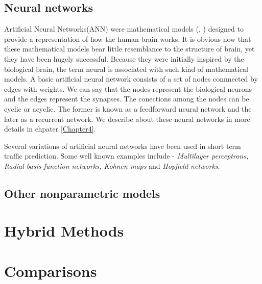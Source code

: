 \subsection{Neural networks}
\label{subsec:neuralNetworksTrafficPred}
Artificial Neural Networks(ANN) were mathematical models (\citet{mcculloch1943logical},
\citet{rosenblatt1958perceptron}) designed to  provide a representation of how the human brain
works. It is obvious now that these mathematical models bear little resemblance to the structure
of brain, yet they have been hugely successful. Because they were initially inspired by the
biological brain, the term neural is associated with such kind of mathematical models. A basic
artificial neural network consists of a set of nodes connnected by edges with weights. We can say
that the nodes represent the biological neurons and the edges represent the synapses. The
conections among the nodes can be cyclic or acyclic. The former is known as a feedforward neural
network and the later as a recurrent network. We describe about these neural networks in more
details in chpater \ref{Chapter4}.

Several variations of artificial neural networks have been used in short term traffic prediction.
Some well known examples include - \textit{Multilayer perceptrons, Radial basis function
networks, Kohnen maps} and \textit{Hopfield networks}.


\subsection{Other nonparametric models}

\section{Hybrid Methods}


\section{Comparisons}
